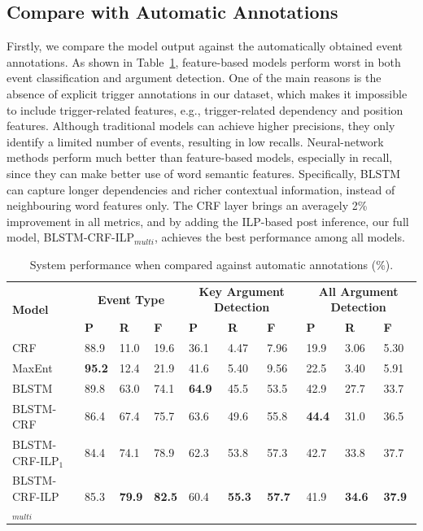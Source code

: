 \subsection{Compare with Automatic Annotations}
Firstly, we compare the model output against the automatically obtained event annotations.
As shown in Table~\ref{tab:1}, feature-based models perform worst in both event classification and argument detection.
One of the main reasons is the absence of explicit trigger annotations in our dataset, which makes it impossible to include trigger-related features, e.g., trigger-related dependency and position features.
Although traditional models can achieve higher precisions, they only identify a limited number of events, resulting in low recalls.
Neural-network methods perform much better than feature-based models, especially in recall, since they can make better use of word semantic features. Specifically, BLSTM can capture longer dependencies and richer contextual information, instead of neighbouring word features only.
The CRF layer brings an averagely 2\% improvement in all metrics, and by adding the ILP-based post inference, our full model, BLSTM-CRF-ILP$_{multi}$, achieves the best performance among all models.

\begin{table}[!t]
\centering
\scriptsize
\begin{tabular}{|l|p{}<{\centering}|p{}<{\centering}|p{}<{\centering}|p{}<{\centering}|p{}<{\centering}|p{}<{\centering}|p{}<{\centering}|p{}<{\centering}|p{}<{\centering}|} \hline
	\multirow{2}{*}{\textbf{Model}} & \multicolumn{3}{c|}{\textbf{Event Type}} & \multicolumn{3}{c|}{\textbf{Key Argument Detection}} &
	\multicolumn{3}{c|}{\textbf{All Argument Detection}} \\ \cline{2-10}
	 & \textbf{P} & \textbf{R} & \textbf{F} & \textbf{P} & \textbf{R} & \textbf{F} & \textbf{P} & \textbf{R} & \textbf{F }\\ \hline
	\rowcolor{Gray} CRF & 88.9 & 11.0 & 19.6 & 36.1 & 4.47 & 7.96 & 19.9 & 3.06 & 5.30  \\ \hline
	MaxEnt & \textbf{95.2} & 12.4 & 21.9 & 41.6 & 5.40 & 9.56 & 22.5 & 3.40 & 5.91 \\ \hline
	\rowcolor{Gray} BLSTM & 89.8 & 63.0 & 74.1 & \textbf{64.9} & 45.5 & 53.5 & 42.9 & 27.7 & 33.7  \\ \hline \hline
	BLSTM-CRF & 86.4 & 67.4 & 75.7 & 63.6 & 49.6 & 55.8 & \textbf{44.4} & 31.0 & 36.5  \\ \hline
	\rowcolor{Gray} BLSTM-CRF-ILP$_{1}$ & 84.4 & 74.1 & 78.9 & 62.3 & 53.8 & 57.3 & 42.7 & 33.8 & 37.7 \\ \hline
	BLSTM-CRF-ILP$_{multi}$ & 85.3 & \textbf{79.9} & \textbf{82.5} & 60.4 & \textbf{55.3} & \textbf{57.7} & 41.9 & \textbf{34.6} & \textbf{37.9} \\ \hline
\end{tabular}
\caption{System performance when compared against automatic annotations (\%).  \label{tab:1}}
\end{table}

